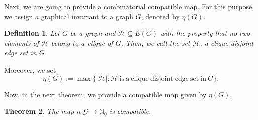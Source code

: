 \documentclass[12pt]{amsart}
\def\NZQ{\mathbb}               %
\def\NN{{\NZQ N}}
\newtheorem{Theorem}{Theorem}[section]
\newtheorem{Definition}[Theorem]{Definition}
\begin{document}
\par \medskip Next, we are going to provide a combinatorial compatible map. For this purpose, we assign a graphical invariant to a graph $G$, denoted by $\eta(G)$.
\begin{Definition}
\em
{Let $G$ be a graph and $\mathcal{H}\subseteq E(G)$ with the property that no two elements of $\mathcal{H}$ belong to a clique of $G$. Then, we call the set $\mathcal{H}$, a \emph{clique disjoint edge set} in $G$.
} 
\end{Definition}	

\par Moreover, we set 
$$\eta(G):=\max\{|\mathcal{H}|: \mathcal{H}~\mathrm{is~a~clique~disjoint~edge~set~in}~G\}.$$

\par Now, in the next theorem, we provide a compatible map given by $\eta(G)$.   
\begin{Theorem}\label{main2}
The map $\eta:\mathcal{G}\longrightarrow \NN_0$ is compatible.
\end{Theorem}	
\end{document}
